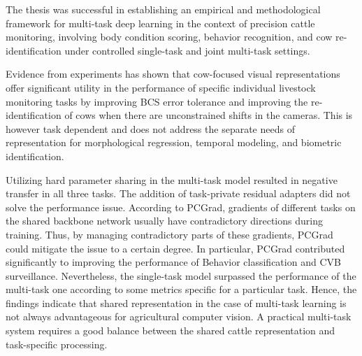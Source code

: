 The thesis was successful in establishing an empirical and methodological framework for multi-task deep learning in the context of precision cattle monitoring, involving body condition scoring, behavior recognition, and cow re-identification under controlled single-task and joint multi-task settings.

Evidence from experiments has shown that cow-focused visual representations offer significant utility in the performance of specific individual livestock monitoring tasks by improving BCS error tolerance and improving the re-identification of cows when there are unconstrained shifts in the cameras. This is however task dependent and does not address the separate needs of representation for morphological regression, temporal modeling, and biometric identification.

Utilizing hard parameter sharing in the multi-task model resulted in negative transfer in all three tasks. The addition of task-private residual adapters did not solve the performance issue. According to PCGrad, gradients of different tasks on the shared backbone network usually have contradictory directions during training. Thus, by managing contradictory parts of these gradients, PCGrad could mitigate the issue to a certain degree. In particular, PCGrad contributed significantly to improving the performance of Behavior classification and CVB surveillance. Nevertheless, the single-task model surpassed the performance of the multi-task one according to some metrics specific for a particular task. Hence, the findings indicate that shared representation in the case of multi-task learning is not always advantageous for agricultural computer vision. A practical multi-task system requires a good balance between the shared cattle representation and task-specific processing.

